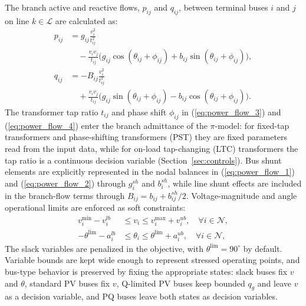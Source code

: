 \documentclass[letterpaper,journal]{IEEEtran}
\begin{document}
The branch active and reactive flows, $p_{ij}$ and $q_{ij}$, between terminal buses $i$ and $j$ on line $k \in \mathcal{L}$ are calculated as:
\begin{align}
	p_{ij} & = g_{ij}\frac{v^2_i}{t^2_{ij}} \nonumber                                                                            \\
	       & \quad - \frac{v_i v_{j}}{t_{ij}} \big( g_{ij}\cos(\theta_{ij}+\phi_{ij}) + b_{ij}\sin(\theta_{ij}+\phi_{ij}) \big),
	\label{eq:power_flow_3}                                                                                                      \\
	q_{ij} & = -B_{ij}\frac{v^2_i}{t^2_{ij}} \nonumber                                                                           \\
	       & \quad + \frac{v_i v_{j}}{t_{ij}} \big( g_{ij}\sin(\theta_{ij}+\phi_{ij}) - b_{ij}\cos(\theta_{ij}+\phi_{ij}) \big).
	\label{eq:power_flow_4}
\end{align}
The transformer tap ratio $t_{ij}$ and phase shift $\phi_{ij}$ in (\ref{eq:power_flow_3}) and (\ref{eq:power_flow_4}) enter the
branch admittance of the $\pi$-model: for fixed-tap transformers and phase-shifting transformers (PST) they are fixed parameters read
from the input data, while for on-load tap-changing (LTC) transformers the tap ratio is a continuous decision variable
(Section~\ref{sec:controls}). Bus shunt elements are explicitly represented in the nodal balances in (\ref{eq:power_flow_1})
and (\ref{eq:power_flow_2}) through $g_i^{sh}$ and $b_i^{sh}$, while line shunt effects are included in the branch-flow terms through
$B_{ij} = b_{ij} + b_{ij}^{sh}/2$. Voltage-magnitude and angle operational limits are enforced as soft constraints:
\begin{align}
	v_i^{\min} - v_i^{lb} & \le v_i \le v_i^{\max} + v_i^{ub}, \quad \forall i \in \mathcal{N}, \label{eq:soft_voltage}     \\
	-\theta^{\lim} - a_i^{lb} & \le \theta_i \le \theta^{\lim} + a_i^{ub}, \quad \forall i \in \mathcal{N}, \label{eq:soft_angle}
\end{align}
The slack variables are penalized in the objective, with $\theta^{\lim}=90^{\circ}$ by default. Variable bounds are
kept wide enough to represent stressed operating points, and bus-type behavior is preserved by fixing the appropriate states:
slack buses fix $v$ and $\theta$, standard PV buses fix $v$, Q-limited PV buses keep bounded $q_g$ and leave $v$ as a decision variable, and PQ buses leave both states as decision variables.
\end{document}

